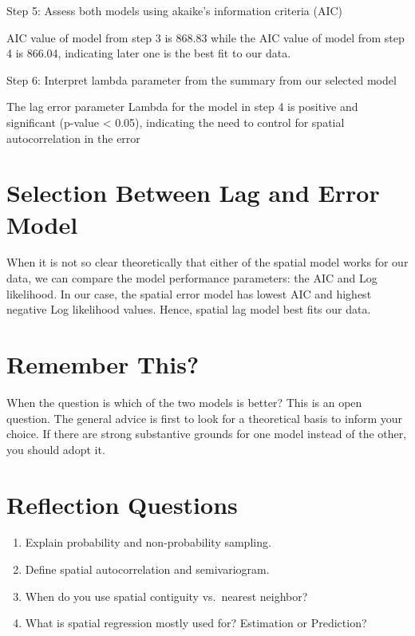 \documentclass[
]{book}
\providecommand{\tightlist}{%
  \setlength{\itemsep}{0pt}\setlength{\parskip}{0pt}}
\begin{document}
Step 5: Assess both models using akaike's information criteria (AIC)

AIC value of model from step 3 is 868.83 while the AIC value of model from step 4 is 866.04, indicating later one is the best fit to our data.

Step 6: Interpret lambda parameter from the summary from our selected model

The lag error parameter Lambda for the model in step 4 is positive and significant (p-value \textless{} 0.05), indicating the need to control for spatial autocorrelation in the error

\hypertarget{selection-between-lag-and-error-model}{%
\section{Selection Between Lag and Error Model}\label{selection-between-lag-and-error-model}}

When it is not so clear theoretically that either of the spatial model works for our data, we can compare the model performance parameters: the AIC and Log likelihood. In our case, the spatial error model has lowest AIC and highest negative Log likelihood values. Hence, spatial lag model best fits our data.

\hypertarget{remember-this-1}{%
\section*{Remember This?}\label{remember-this-1}}

When the question is which of the two models is better? This is an open question. The general advice is first to look for a theoretical basis to inform your choice. If there are strong substantive grounds for one model instead of the other, you should adopt it.

\hypertarget{reflection-questions-6}{%
\section*{Reflection Questions}\label{reflection-questions-6}}

\begin{enumerate}
\def\labelenumi{\arabic{enumi}.}
\tightlist
\item
  Explain probability and non-probability sampling.
\item
  Define spatial autocorrelation and semivariogram.
\item
  When do you use spatial contiguity vs.~nearest neighbor?
\item
  What is spatial regression mostly used for? Estimation or Prediction?
\end{enumerate}
\end{document}
